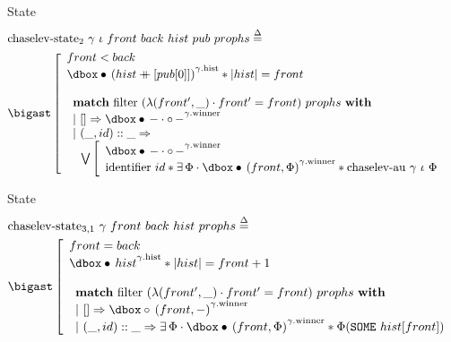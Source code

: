 \begin{frame}{State}
\small
\begin{align*}
		&\mathrm{chaselev \mathhyphen state_2}\ \gamma\ \iota\ front\ back\ hist\ pub\ prophs
		\eqdef
	\\
		&\iBigsep\left[\begin{array}{l}
				front < back
			\\
				\iGhost{\gamma\mathrm{.hist}}{\iAuth{(hist \mdoubleplus [pub [0]])}} \iSep
				| hist | = front
			\\\\
				\begin{array}{l}
						\bold{match}\ \mathrm{filter}\ (\lambda (front', \_) \cdot front' = front)\ prophs\ \bold{with}
					\\
						|\ [] \Rightarrow
						\iGhost{\gamma\mathrm{.winner}}{\iAuth{-} \cdot \iFrag{-}}
					\\
						|\ (\_, id) :: \_ \Rightarrow
					\\
						\ \ 
						\bigvee\left[\begin{array}{l}
								\iGhost{\gamma\mathrm{.winner}}{\iAuth{-} \cdot \iFrag{-}}
							\\
								\mathrm{identifier}\ id \iSep
								\exists \Phi \cdot
								\iGhost{\gamma\mathrm{.winner}}{\iAuth{(front, \Phi)}} \iSep
								\mathrm{chaselev \mathhyphen au}\ \gamma\ \iota\ \Phi
						\end{array}\right.
				\end{array}
		\end{array}\right.
\end{align*}
\end{frame}


\begin{frame}{State}
\small
\begin{align*}
		&\mathrm{chaselev \mathhyphen state_{3,1}}\ \gamma\ front\ back\ hist\ prophs
		\eqdef
	\\
		&\iBigsep\left[\begin{array}{l}
				front = back
			\\
				\iGhost{\gamma\mathrm{.hist}}{\iAuth{hist}} \iSep
				| hist | = front + 1
			\\\\
				\begin{array}{l}
						\bold{match}\ \mathrm{filter}\ (\lambda (front', \_) \cdot front' = front)\ prophs\ \bold{with}
					\\
						|\ [] \Rightarrow
						\iGhost{\gamma\mathrm{.winner}}{\iFrag{(front, -)}}
					\\
						|\ (\_, id) :: \_ \Rightarrow
						\exists \Phi \cdot
						\iGhost{\gamma\mathrm{.winner}}{\iAuth{(front, \Phi)}} \iSep
						\Phi (\exprSome{hist [front]})
				\end{array}
		\end{array}\right.
\end{align*}
\end{frame}

